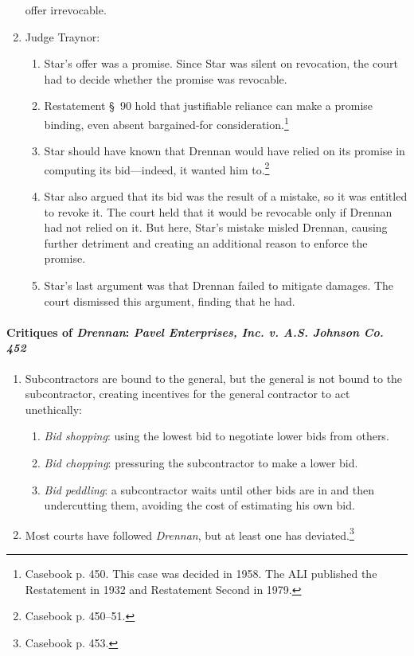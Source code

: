 \begin{enumerate}
    offer irrevocable.
    \item Judge Traynor:
    \begin{enumerate}
        \item Star's offer was a promise. Since Star was silent on revocation, 
        the court had to decide whether the promise was revocable.
        \item Restatement \S\ 90 hold that justifiable reliance can 
        make a promise binding, even absent bargained-for 
        consideration.\footnote{Casebook p. 450. This case was decided in 
        1958. The ALI published the Restatement in 1932 and Restatement Second 
        in 1979.}
        \item Star should have known that Drennan would have relied on its 
        promise in computing its bid---indeed, it wanted him 
        to.\footnote{Casebook p. 450--51.}
        \item Star also argued that its bid was the result of a mistake, so it 
        was entitled to revoke it. The court held that it would be revocable 
        only if Drennan had not relied on it. But here, Star's mistake misled 
        Drennan, causing further detriment and creating an additional reason 
        to enforce the promise.
        \item Star's last argument was that Drennan failed to mitigate 
        damages. The court dismissed this argument, finding that he had.
    \end{enumerate}
\end{enumerate}

\paragraph{Critiques of \emph{Drennan}: \emph{Pavel Enterprises, Inc. v. A.S. 
Johnson Co. 452}}

\begin{enumerate}
    \item Subcontractors are bound to the general, but the general is not 
    bound to the subcontractor, creating incentives for the general contractor 
    to act unethically:
    \begin{enumerate}
        \item \emph{Bid shopping}: using the lowest bid to negotiate lower 
        bids from others.
        \item \emph{Bid chopping}: pressuring the subcontractor to make a 
        lower bid.
        \item \emph{Bid peddling}: a subcontractor waits until other bids are 
        in and then undercutting them, avoiding the cost of estimating his own 
        bid.
    \end{enumerate}
    \item Most courts have followed \emph{Drennan}, but at least one has 
    deviated.\footnote{Casebook p. 453.}
\end{enumerate}


